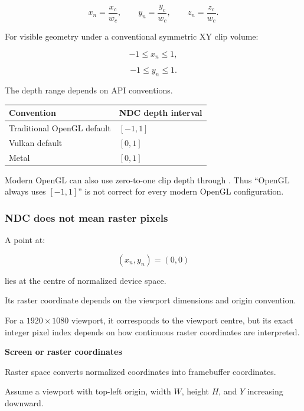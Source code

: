 \[
 \boxed{ x_n=\frac{x_c}{w_c}, \qquad y_n=\frac{y_c}{w_c}, \qquad z_n=\frac{z_c}{w_c} }.
\]

For visible geometry under a conventional symmetric XY clip volume:

\[
 -1\le x_n\le1,
\]

\[
 -1\le y_n\le1.
\]

The depth range depends on API conventions.

{\def\LTcaptype{none} %
\begin{longtable}[]{@{}ll@{}}
\toprule\noalign{}
Convention & NDC depth interval \\
\midrule\noalign{}
\endhead
\bottomrule\noalign{}
\endlastfoot
Traditional OpenGL default & \([-1,1]\) \\
Vulkan default & \([0,1]\) \\
Metal & \([0,1]\) \\
\end{longtable}
}

Modern OpenGL can also use zero-to-one clip depth through . Thus ``OpenGL always uses \([-1,1]\)'' is not correct for every modern OpenGL configuration. 

\subsubsection{NDC does not mean raster pixels}\label{02-foundations-ii-ch032-ndc-does-not-mean-raster-pixels}

\hypertarget{02-foundations-ii-ch032-ndc-does-not-mean-raster-pixels}{}

A point at:

\[
 (x_n,y_n)=(0,0)
\]

lies at the centre of normalized device space.

Its raster coordinate depends on the viewport dimensions and origin convention.

For a \(1920\times1080\) viewport, it corresponds to the viewport centre, but its exact integer pixel index depends on how continuous raster coordinates are interpreted.

\textbf{Screen or raster coordinates}

Raster space converts normalized coordinates into framebuffer coordinates.

Assume a viewport with top-left origin, width \(W\), height \(H\), and \(Y\) increasing downward.

